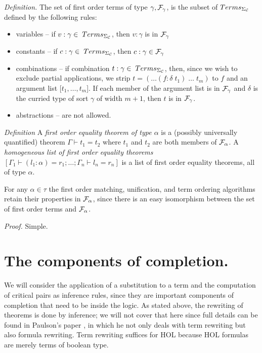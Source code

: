 {\em Definition.} The set of first order terms of type $\gamma, {\cal
F}_\gamma$, is the subset of $Terms_{\Sigma_{\cal C}}$ defined by the following
rules:
\begin{itemize}
\item variables -- if $v:\gamma \in \;Terms_{\Sigma_{\cal C}}$, then
$v:\gamma$ is in ${\cal F}_\gamma$ 
\item constants -- if $c:\gamma \in \;Terms_{\Sigma_{\cal C}}$, then
$c:\gamma \in {\cal F}_\gamma$ 
\item combinations -- if combination $t:\gamma \in \;Terms_{\Sigma_{\cal C}}$,
then, since we wish to exclude partial applications, we strip $t =
(\ldots(f\!:\!\delta\; t_1)\;\ldots\;t_m)$ to $f$ and an argument list [$t_1,
\ldots, t_m$]. If each member of the argument list is in ${\cal F}_\gamma$ and
$\delta$ is the curried type of sort $\gamma$ of width $m+1$, then $t$ is in
${\cal F}_\gamma$. 
\item abstractions -- are not allowed.
\end{itemize}

{\em Definition} A {\it first order equality theorem of type $\alpha$} is a
(possibly universally quantified) theorem $\Gamma \vdash t_1 = t_2$ where $t_1$
and $t_2$ are both members of ${\cal F}_\alpha$. A {\it homogeneous list of
first order equality theorems} $[\Gamma_1 \vdash (l_1:\alpha) = r_1; \ldots;
\Gamma_n \vdash l_n = r_n]$ is a list of first order equality theorems, all of
type $\alpha$.

For any $\alpha \in \tau$ the first order matching, unification, and term
ordering algorithms retain their properties in ${\cal F}_\alpha$, since there
is an easy isomorphism between the set of first order terms and ${\cal
F}_\alpha$.

{\it Proof.} Simple.


\section{The components of completion.}

We will consider the application of a substitution to a term and the
computation of critical pairs as inference rules, since they are important
components of completion that need to be inside the logic. As stated above, the
rewriting of theorems is done by inference; we will not cover that here since
full details can be found in Paulson's paper \cite{paulson83}, in which he not
only deals with term rewriting but also formula rewriting. Term rewriting
suffices for HOL because HOL formulas are merely terms of boolean type.

